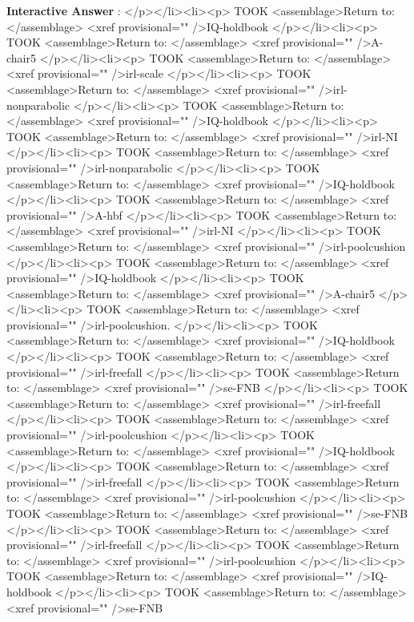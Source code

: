 \documentclass[11pt,letter,openany,makeidx]{book}
\newcounter{AtIQ}
\renewcommand{\theAtIQ}{Answer \arabic{AtIQ}}
\newenvironment{AIQ}{\begin{list}{\textbf{Interactive \theAtIQ}:}{\usecounter{AtIQ} \leftmargin 12pt}}{\end{list}}
\begin{document}
\begin{AIQ}
</p></li><li><p>\label{A-hitY} TOOK  <assemblage>Return to: </assemblage> <xref provisional="" />{IQ-holdbook}
</p></li><li><p>\label{A-noFT} TOOK <assemblage>Return to: </assemblage> <xref provisional="" />{A-chair5}
</p></li><li><p>\label{A-scale.ramp} TOOK   <assemblage>Return to: </assemblage> <xref provisional="" />{irl-scale}
</p></li><li><p>\label{A-pitches.side} TOOK  <assemblage>Return to: </assemblage> <xref provisional="" />{irl-nonparabolic}
</p></li><li><p>\label{A-hitN} TOOK <assemblage>Return to: </assemblage> <xref provisional="" />{IQ-holdbook}
</p></li><li><p>\label{A-chair7} TOOK <assemblage>Return to: </assemblage> <xref provisional="" />{irl-NI}
</p></li><li><p>\label{A-pitches.top} TOOK <assemblage>Return to: </assemblage> <xref provisional="" />{irl-nonparabolic}
</p></li><li><p>\label{A-landedY} TOOK  <assemblage>Return to: </assemblage> <xref provisional="" />{IQ-holdbook}
</p></li><li><p>\label{A-gravity}  TOOK <assemblage>Return to: </assemblage> <xref provisional="" />{A-hbf}
</p></li><li><p>\label{A-chair8} TOOK <assemblage>Return to: </assemblage> <xref provisional="" />{irl-NI}
</p></li><li><p>\label{A-pool-roll} TOOK <assemblage>Return to: </assemblage> <xref provisional="" />{irl-poolcushion}
</p></li><li><p>\label{A-landedN} TOOK <assemblage>Return to: </assemblage> <xref provisional="" />{IQ-holdbook}
</p></li><li><p>\label{A-FT} TOOK  <assemblage>Return to: </assemblage> <xref provisional="" />{A-chair5}
</p></li><li><p>\label{A-pool-bumper} TOOK <assemblage>Return to: </assemblage> <xref provisional="" />{irl-poolcushion}.
</p></li><li><p>\label{A-zero} TOOK <assemblage>Return to: </assemblage> <xref provisional="" />{IQ-holdbook}
</p></li><li><p>\label{A-firstfall} TOOK  <assemblage>Return to: </assemblage> <xref provisional="" />{irl-freefall}
</p></li><li><p>\label{A-floor}  TOOK  <assemblage>Return to: </assemblage> <xref provisional="" />{se-FNB}
</p></li><li><p>\label{A-firstwhy} TOOK  <assemblage>Return to: </assemblage> <xref provisional="" />{irl-freefall}
</p></li><li><p>\label{A-noncue} TOOK <assemblage>Return to: </assemblage> <xref provisional="" />{irl-poolcushion}
</p></li><li><p>\label{A-one} TOOK  <assemblage>Return to: </assemblage> <xref provisional="" />{IQ-holdbook}
</p></li><li><p>\label{A-fallv} TOOK  <assemblage>Return to: </assemblage> <xref provisional="" />{irl-freefall}
</p></li><li><p>\label{A-pool-spin} TOOK <assemblage>Return to: </assemblage> <xref provisional="" />{irl-poolcushion}
</p></li><li><p>\label{A-second} TOOK  <assemblage>Return to: </assemblage> <xref provisional="" />{se-FNB}
</p></li><li><p>\label{A-falla} TOOK  <assemblage>Return to: </assemblage> <xref provisional="" />{irl-freefall}
</p></li><li><p>\label{A-pool-later} TOOK <assemblage>Return to: </assemblage> <xref provisional="" />{irl-poolcushion}
</p></li><li><p>\label{A-two} TOOK  <assemblage>Return to: </assemblage> <xref provisional="" />{IQ-holdbook}
</p></li><li><p>\label{A-third} TOOK  <assemblage>Return to: </assemblage> <xref provisional="" />{se-FNB}


\end{AIQ}
\end{document}
